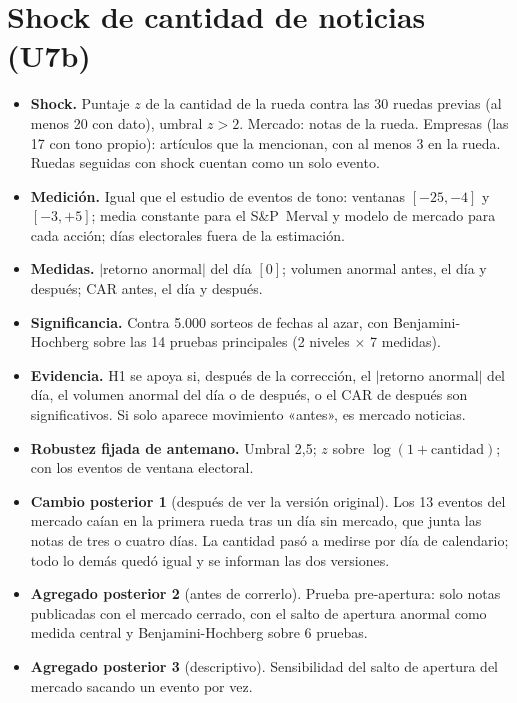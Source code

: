 \section{Shock de cantidad de noticias (U7b)}

\begin{itemize}
  \item \textbf{Shock.} Puntaje $z$ de la cantidad de la rueda contra las 30 ruedas previas
        (al menos 20 con dato), umbral $z>2$. Mercado: notas de la rueda. Empresas (las 17 con
        tono propio): artículos que la mencionan, con al menos 3 en la rueda. Ruedas seguidas
        con shock cuentan como un solo evento.
  \item \textbf{Medición.} Igual que el estudio de eventos de tono: ventanas $[-25,-4]$ y
        $[-3,+5]$; media constante para el S\&P~Merval y modelo de mercado para cada acción; días
        electorales fuera de la estimación.
  \item \textbf{Medidas.} $|$retorno anormal$|$ del día $[0]$; volumen anormal antes, el día y
        después; CAR antes, el día y después.
  \item \textbf{Significancia.} Contra 5.000 sorteos de fechas al azar, con Benjamini-Hochberg
        sobre las 14 pruebas principales (2 niveles $\times$ 7 medidas).
  \item \textbf{Evidencia.} H1 se apoya si, después de la corrección, el $|$retorno anormal$|$
        del día, el volumen anormal del día o de después, o el CAR de después son
        significativos. Si solo aparece movimiento «antes», es mercado \flecha{} noticias.
  \item \textbf{Robustez fijada de antemano.} Umbral 2,5; $z$ sobre $\log(1+\text{cantidad})$;
        con los eventos de ventana electoral.
  \item \textbf{Cambio posterior 1} (después de ver la versión original). Los 13 eventos del
        mercado caían en la primera rueda tras un día sin mercado, que junta las notas de tres o
        cuatro días. La cantidad pasó a medirse por día de calendario; todo lo demás quedó
        igual y se informan las dos versiones.
  \item \textbf{Agregado posterior 2} (antes de correrlo). Prueba pre-apertura: solo notas
        publicadas con el mercado cerrado, con el salto de apertura anormal como medida central
        y Benjamini-Hochberg sobre 6 pruebas.
  \item \textbf{Agregado posterior 3} (descriptivo). Sensibilidad del salto de apertura del
        mercado sacando un evento por vez.
\end{itemize}

